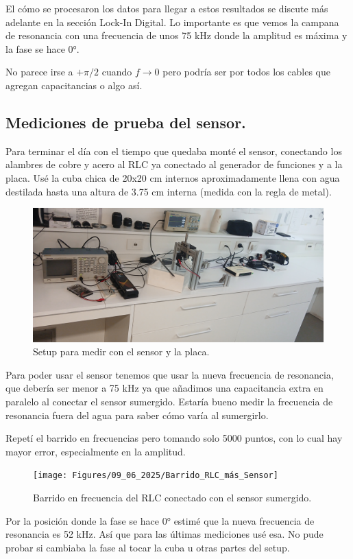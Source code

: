 El cómo se procesaron los datos para llegar a estos resultados se discute más adelante en la sección Lock-In Digital. Lo importante es que vemos la campana de resonancia con una frecuencia de unos 75 kHz donde la amplitud es máxima y la fase se hace 0°. %

No parece irse a $+\pi/2$ cuando $f\rightarrow0$ pero podría ser por todos los cables que agregan capacitancias o algo así. 

\subsection*{Mediciones de prueba del sensor.} 
Para terminar el día con el tiempo que quedaba monté el sensor, conectando los alambres de cobre y acero al RLC ya conectado al generador de funciones y a la placa. Usé la cuba chica de 20x20 cm internos aproximadamente llena con agua destilada hasta una altura de 3.75 cm interna (medida con la regla de metal).

\begin{figure}[th!]
	\centering
	\includegraphics[width=0.567\linewidth]{Figures/09_06_2025/Setup_sensor}
	\caption{Setup para medir con el sensor y la placa.}
	\label{fig:setupsensor}
\end{figure}

Para poder usar el sensor tenemos que usar la nueva frecuencia de resonancia, que debería ser menor a 75 kHz ya que añadimos una capacitancia extra en paralelo al conectar el sensor sumergido. Estaría bueno medir la frecuencia de resonancia fuera del agua para saber cómo varía al sumergirlo. 

Repetí el barrido en frecuencias pero tomando solo 5000 puntos, con lo cual hay mayor error, especialmente en la amplitud. 

\begin{figure}[th!]
	\centering
	\texttt{[image: Figures/09\_06\_2025/Barrido\_RLC\_más\_Sensor]}
	\caption{Barrido en frecuencia del RLC conectado con el sensor sumergido.}
	\label{fig:barridorlcmassensor}
\end{figure}

Por la posición donde la fase se hace 0° estimé que la nueva frecuencia de resonancia es 52 kHz. Así que para las últimas mediciones usé esa. No pude probar si cambiaba la fase al tocar la cuba u otras partes del setup. 

